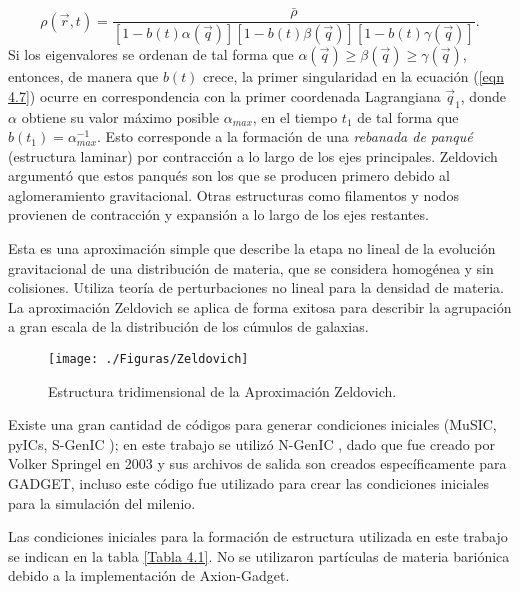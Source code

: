 \documentclass[a4paper,openright,10pt, oneside, final]{book}
\begin{document}
\begin{equation}
\rho(\vec{r}, t) = \frac{\bar{\rho}}{[1 - b(t)\alpha(\vec{q})][1 - b(t)\beta(\vec{q})][1 - b(t)\gamma(\vec{q})]}.\label{eqn 4.7}
\end{equation}
Si los eigenvalores se ordenan de tal forma que $\alpha(\vec{q})\geq \beta(\vec{q})\geq \gamma(\vec{q})$, entonces, de manera que $b(t)$ crece, la primer singularidad en la ecuación (\ref{eqn 4.7}) ocurre en correspondencia con la primer coordenada Lagrangiana $\vec{q}_{1}$, donde $\alpha$ obtiene su valor máximo posible $\alpha_{max}$, en el tiempo $t_{1}$ de tal forma que $b(t_{1}) = \alpha_{max}^{-1}$. Esto corresponde a la formación de una \textit{rebanada de panqué} (estructura laminar) por contracción a lo largo de los ejes principales. Zeldovich argumentó que estos panqués son los que se producen primero debido al aglomeramiento gravitacional. Otras estructuras como filamentos y nodos provienen de contracción y expansión a lo largo de los ejes restantes.

Esta es una aproximación simple que describe la etapa no lineal de la evolución gravitacional de una distribución de materia, que se considera homogénea y sin colisiones. Utiliza teoría de perturbaciones no lineal para la densidad de materia. La aproximación Zeldovich se aplica de forma exitosa para describir la agrupación a gran escala de la distribución de los cúmulos de galaxias.

\begin{figure}
\centering
\texttt{[image: ./Figuras/Zeldovich]}
\caption{\footnotesize{Estructura tridimensional de la Aproximación Zeldovich.}}\label{Zeld}
\end{figure}

Existe una gran cantidad de códigos para generar condiciones iniciales (MuSIC, pyICs, S-GenIC \cite{4.3}); en este trabajo se utilizó N-GenIC \cite{3.0.3}, dado que fue creado por Volker Springel en 2003 y sus archivos de salida son creados específicamente para GADGET, incluso este código fue utilizado para crear las condiciones iniciales para la simulación del milenio.

Las condiciones iniciales para la formación de estructura utilizada en este trabajo se indican en la tabla \ref{Tabla 4.1}. No se utilizaron partículas de materia bariónica debido a la implementación de Axion-Gadget.\\\\\\\\\\\\\
\end{document}
